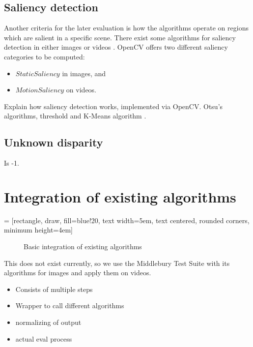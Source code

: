 \subsection*{Saliency detection}

Another criteria for the later evaluation is how the algorithms operate on regions which are salient in a specific scene.
There exist some algorithms for saliency detection in either images or videos \citep{dittrich2013saliency, opencv_library}.
OpenCV offers two different saliency categories to be computed:
\begin{itemize}
  \item $StaticSaliency$ in images, and
  \item $MotionSaliency$ on videos.
\end{itemize}

\noindent Explain how saliency detection works, implemented via OpenCV. Otsu's algorithms, threshold and K-Means algorithm \citep{hou2007saliency}.

\subsection*{Unknown disparity}

Is -1.

\section{Integration of existing algorithms}

 = [rectangle, draw, fill=blue!20,
    text width=5em, text centered, rounded corners, minimum height=4em]

\begin{figure}[h]
  \centering
  \caption{Basic integration of existing algorithms}
  \label{fig:integration}
\end{figure}

This does not exist currently, so we use the Middlebury Test Suite with its algorithms for images and apply them on videos.

\begin{itemize}
	\item Consists of multiple steps
	\item Wrapper to call different algorithms
	\item normalizing of output
	\item actual eval process
\end{itemize}

